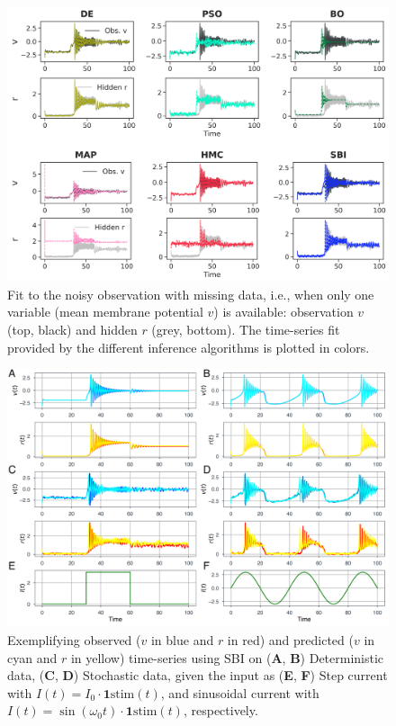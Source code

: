 \documentclass[preprint,11pt,authoryear]{elsarticle}
\begin{document}
\begin{figure}[ht]
    \centering
    \includegraphics[width=\linewidth]{Figs/FigS10.png}
    \renewcommand{\thefigure}{S\arabic{figure}}
    \caption{Fit to the noisy observation with missing data, i.e., when only one variable (mean membrane potential $v$) is available: observation $v$ (top, black) and hidden $r$ (grey, bottom). The time-series fit provided by the different inference algorithms is plotted in colors.}
    \label{fig:SDEmissingdata_timeseries}
\end{figure}



\begin{figure}
    \centering
    \includegraphics[width=\linewidth]{Figs/FigS11.png}
    \renewcommand{\thefigure}{S\arabic{figure}}
    \caption{Exemplifying observed ($v$ in blue and $r$ in red) and predicted ($v$ in cyan and $r$ in yellow) time-series using SBI on (\textbf{A}, \textbf{B}) Deterministic data, (\textbf{C}, \textbf{D}) Stochastic data, given the input as (\textbf{E}, \textbf{F}) Step current with $I(t)=I_0 \cdot \mathbf{1}{\text{stim}}(t)$, and sinusoidal current with $I(t)=\sin (\omega_0 t) \cdot \mathbf{1}{\text{stim}}(t)$, respectively.}
    \label{fig:SBI_Timeseries_ISin_IStep}
\end{figure}
\end{document}

